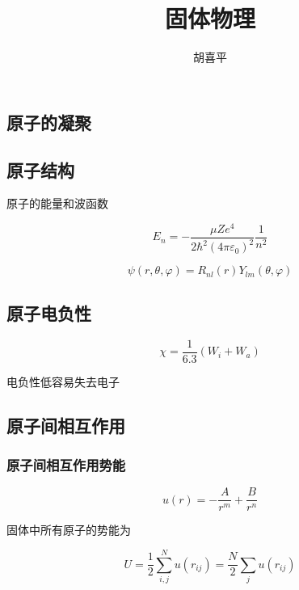 \documentclass{article}
\author{胡喜平}
\title{固体物理}
\begin{document}
\begin{multicols}{2}
  

\section{原子的凝聚}

\subsection{原子结构}

原子的能量和波函数

\begin{equation*}
  E_n = - \frac{\mu Z e^{4}}{2 \hbar^{2} \left( 4 \pi \varepsilon_0 \right)^2} \frac{1}{n^{2}}
\end{equation*}

\begin{equation*}
  \psi \left( r, \theta, \varphi \right) = R_{nl} \left( r \right) Y_{lm} \left( \theta, \varphi \right)
\end{equation*}

\subsection{原子电负性}

\begin{equation*}
  \chi = \frac{1}{6.3} \left( W_i + W_a \right)
\end{equation*}

电负性低容易失去电子

\subsection{原子间相互作用}

\subsubsection{原子间相互作用势能}

\begin{equation*}
  u \left( r \right) = - \frac{A}{r^{m}} + \frac{B}{r^{n}}
\end{equation*}

固体中所有原子的势能为

\begin{equation*}
  U = \frac{1}{2} \sum_{i,j}^N u \left( r_{ij} \right) = \frac{N}{2} \sum_j u \left( r_{ij} \right)
\end{equation*}


\end{multicols}
\end{document}
